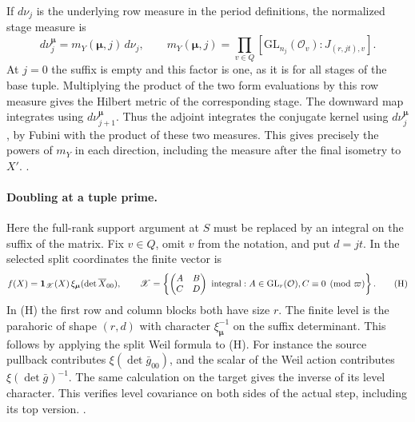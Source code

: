 If \(d\nu_j\) is the underlying row measure in the
period definitions, the normalized stage measure is
\[
 d\nu_j^{\boldsymbol\mu}
   =m_Y(\boldsymbol\mu,j)\,d\nu_j,\qquad
 m_Y(\boldsymbol\mu,j)
   =\prod_{v\in Q}[\mathrm{GL}_{n_j}(\mathcal O_v):
                 J_{(r,jt),v}].
 \tag{G}
\]
At \(j=0\) the suffix is empty and this factor is one,
as it is for all stages of the base tuple.
Multiplying the product of the two form evaluations
by this row measure gives the Hilbert metric of the
corresponding stage. The downward map integrates using
\(d\nu_{j+1}^{\boldsymbol\mu}\). Thus the adjoint
integrates the conjugate kernel using
\(d\nu_j^{\boldsymbol\mu}\), by Fubini with the
product of these two measures. This gives precisely
the powers of \(m_Y\) in each direction, including
the measure after the final isometry to \(X'\).
.

\paragraph{Doubling at a tuple prime.}
Here the full-rank support argument at \(S\) must be
replaced by an integral on the suffix of the matrix.
Fix \(v\in Q\), omit \(v\) from the notation, and put
\(d=jt\). In the selected split coordinates the
finite vector is
\[
 f(X)={\bf1}_{\mathscr X}(X)\,
          \xi_{\boldsymbol\mu}(\det \overline{X}_{00}),
 \qquad
 \mathscr X=\left\{
 \begin{pmatrix} A & B \\ C & D\end{pmatrix}
 \text{ integral}: A\in\mathrm{GL}_r(\mathcal O),
                   C\equiv0\pmod\varpi\right\}.
 \tag{H}
\]
In (H) the first row and column blocks both have size \(r\).
The finite level is the parahoric of shape \((r,d)\)
with character \(\xi_{\boldsymbol\mu}^{-1}\) on the
suffix determinant. This follows by applying the
split Weil formula to (H). For instance the source
pullback contributes \(\xi(\det\bar g_{00})\), and the
scalar of the Weil action contributes
\(\xi(\det\bar g)^{-1}\).
The same calculation on the target gives the inverse
of its level character. This verifies level covariance
on both sides of the actual step, including its top version.
.

